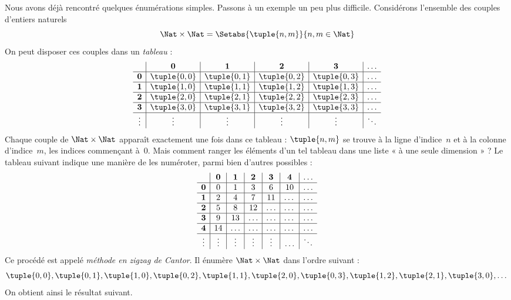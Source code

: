 \documentclass[../../../include/open-logic-section]{subfiles}
\begin{document}


\begin{explain}
Nous avons déjà rencontré quelques énumérations simples. Passons
à un exemple un peu plus difficile. Considérons l’ensemble des couples
d’entiers naturels
\[
\Nat \times \Nat = \Setabs{\tuple{n,m}}{n,m \in \Nat}
\]
On peut disposer ces couples dans un \emph{tableau} :
\[
\begin{array}{ c | c | c | c | c | c}
& \mathbf 0 & \mathbf 1 & \mathbf 2 & \mathbf 3 & \dots \\
\hline
\mathbf 0 & \tuple{0,0} & \tuple{0,1} & \tuple{0,2} & \tuple{0,3} & \dots \\
\hline
\mathbf 1 & \tuple{1,0} & \tuple{1,1} & \tuple{1,2} & \tuple{1,3} & \dots \\
\hline
\mathbf 2 & \tuple{2,0} & \tuple{2,1} & \tuple{2,2} & \tuple{2,3} & \dots \\
\hline
\mathbf 3 & \tuple{3,0} & \tuple{3,1} & \tuple{3,2} & \tuple{3,3} & \dots \\
\hline
\vdots & \vdots & \vdots & \vdots & \vdots & \ddots\\
\end{array}
\]
Chaque couple de $\Nat \times \Nat$ apparaît exactement une fois
dans ce tableau : $\tuple{n,m}$ se trouve à la ligne d’indice~$n$
et à la colonne d’indice~$m$, les indices commençant à~$0$.
Mais comment ranger les éléments d’un tel tableau dans une liste
« à une seule dimension » ? Le tableau suivant indique une manière
de les numéroter, parmi bien d’autres possibles :
\[
\begin{array}{ c | c | c | c | c | c | c}
& \mathbf 0 & \mathbf 1 & \mathbf 2 & \mathbf 3 & \mathbf 4 &\dots \\
\hline
\mathbf 0 & 0  & 1& 3 & 6& 10 &\ldots \\
\hline
\mathbf 1 &2 & 4& 7 & 11 & \dots &\ldots \\
\hline
\mathbf 2 & 5 & 8 & 12 & \ldots & \dots&\ldots \\
\hline
\mathbf 3 & 9 & 13 & \ldots & \ldots & \dots & \ldots \\
\hline
\mathbf 4 & 14 & \ldots & \ldots & \ldots & \dots & \ldots \\
\hline
\vdots & \vdots & \vdots & \vdots & \vdots&\ldots & \ddots\\
\end{array}
\]\noindent
Ce procédé est appelé \emph{méthode en zigzag de Cantor}.
Il énumère $\Nat \times \Nat$ dans l’ordre suivant :
\[
\tuple{0,0}, \tuple{0,1}, \tuple{1,0}, \tuple{0,2}, \tuple{1,1},
\tuple{2,0}, \tuple{0,3}, \tuple{1,2}, \tuple{2,1}, \tuple{3,0}, \dots
\]
On obtient ainsi le résultat suivant.
\end{explain}
\end{document}
